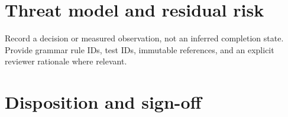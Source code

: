 \documentclass[11pt,letterpaper]{article}
\begin{document}
\section{Threat model and residual risk}
Record a decision or measured observation, not an inferred completion state. Provide grammar rule IDs, test IDs, immutable references, and an explicit reviewer rationale where relevant.
\PTRating
\section{Disposition and sign-off}
\end{document}
